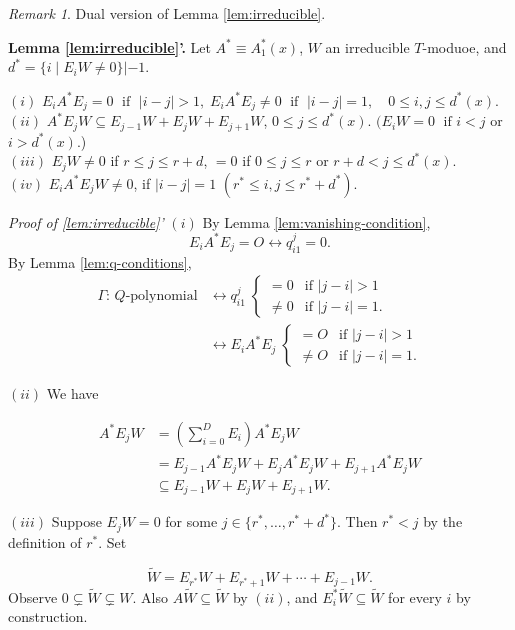 \documentclass[
]{book}
\theoremstyle{definition}
\theoremstyle{definition}
\theoremstyle{definition}
\theoremstyle{definition}
\theoremstyle{remark}
\newtheorem*{remark}{Remark}
\begin{document}
\begin{remark}
Dual version of Lemma \ref{lem:irreducible}.

\textbf{Lemma \ref{lem:irreducible}'.}
Let \(A^* \equiv A^*_1(x)\), \(W\) an irreducible \(T\)-moduoe, and \(d^* = \{i\mid E_iW\neq 0\}|-1\).

\((i)\) \(E_iA^*E_j = 0 \; \text{ if }\; |i-j|>1, \; E_iA^*E_j\neq 0 \; \text{ if }\; |i-j| = 1, \quad 0\leq i,j\leq d^*(x)\).\\
\((ii)\) \(A^*E_jW \subseteq E_{j-1}W + E_jW + E_{j+1}W\), \(0\leq j \leq d^*(x)\). \((E_iW = 0 \; \text{ if } i<j\) or \(i > d^*(x)\).)\\
\((iii)\) \(E_jW \neq 0\) if \(r\leq j \leq r+d\), \(=0\) if \(0\leq j\leq r\) or \(r+d < j \leq d^*(x)\).\\
\((iv)\) \(E_iA^*E_jW \neq 0\), if \(|i-j| = 1\) \((r^* \leq i,j \leq r^*+d^*)\).

\emph{Proof of \ref{lem:irreducible}'}
\textbar{} \((i)\) By Lemma \ref{lem:vanishing-condition},
\[E_iA^*E_j = O \leftrightarrow q^j_{i1} = 0.\]
By Lemma \ref{lem:q-conditions},
\begin{align}
\Gamma\text{: $Q$-polynomial} &\leftrightarrow q^j_{i1} \;\begin{cases} = 0 & \text{if }|j-i|>1\\
\neq 0 & \text{if }|j-i|=1.\end{cases}\\
& \leftrightarrow E_iA^*E_j \;\begin{cases} = O & \text{if }|j-i|>1\\
\neq O & \text{if }|j-i|=1.\end{cases}
\end{align}

\((ii)\) We have

\begin{align}
A^*E_jW & = \left(\sum_{i=0}^{D}E_i\right)A^*E_jW\\
& = E_{j-1}A^*E_jW + E_jA^*E_jW + E_{j+1}A^*E_jW\\
& \subseteq E_{j-1}W + E_jW + E_{j+1}W.
\end{align}

\((iii)\) Suppose \(E_jW = 0\) for some \(j\in \{r^*, \ldots, r^*+d^*\}\). Then \(r^* < j\) by the definition of \(r^*\). Set

\[\widetilde{W} = E_{r^*}W + E_{r^*+1}W + \cdots + E_{j-1}W.\]
Observe \(0\subsetneq \widetilde{W} \subsetneq W\).
Also \(A\widetilde{W} \subseteq \widetilde{W}\) by \((ii)\), and \(E_i^*\widetilde{W} \subseteq \widetilde{W}\) for every \(i\) by construction.


\end{remark}
\end{document}
